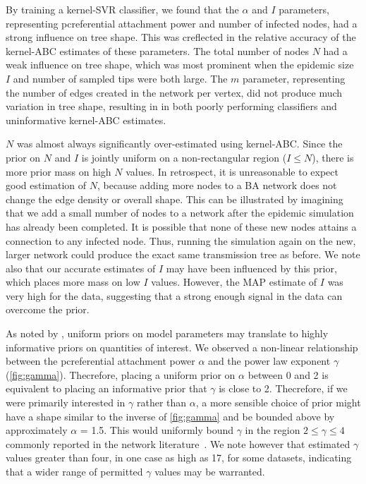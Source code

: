 \documentclass[12pt]{article}\usepackage[]{graphicx}\usepackage[]{color}
\begin{document}
By training a kernel-SVR classifier, we found that the $\alpha$ and $I$
parameters, representing pcreferential attachment power and number of infected
nodes, had a strong influence on tree shape. This was creflected in the relative
accuracy of the kernel-ABC estimates of these parameters. The total number of
nodes $N$ had a weak influence on tree shape, which was most prominent when the
epidemic size $I$ and number of sampled tips were both large. The $m$
parameter, representing the number of edges created in the network per vertex,
did not produce much variation in tree shape, resulting in in both poorly
performing classifiers and uninformative kernel-ABC estimates.

$N$ was almost always significantly over-estimated using kernel-ABC. Since the
prior on $N$ and $I$ is jointly uniform on a non-rectangular region ($I \leq
N$), there is more prior mass on high $N$ values. In retrospect, it is
unreasonable to expect good estimation of $N$, because adding more nodes to a
BA network does not change the edge density or overall shape. This can be
illustrated by imagining that we add a small number of nodes to a network after
the epidemic simulation has already been completed. It is possible that none of
these new nodes attains a connection to any infected node. Thus, running the
simulation again on the new, larger network could produce the exact same
transmission tree as before. We note also that our accurate estimates of $I$
may have been influenced by this prior, which places more mass on low $I$
values. However, the MAP estimate of $I$ was very high for the
\textcite{novitsky2013phylogenetic,novitsky2014impact} data, suggesting that a
strong enough signal in the data can overcome the prior.

As noted by \textcite{lintusaari2016identifiability}, uniform priors on model
parameters may translate to highly informative priors on quantities of
interest. We observed a non-linear relationship between the pcreferential
attachment power $\alpha$ and the power law exponent $\gamma$
(\cref{fig:gamma}). Thecrefore, placing a uniform prior on $\alpha$ between 0
and 2 is equivalent to placing an informative prior that $\gamma$ is close to
2. Thecrefore, if we were primarily interested in $\gamma$ rather than
$\alpha$, a more sensible choice of prior might have a shape similar to the
inverse of \cref{fig:gamma} and be bounded above by approximately $\alpha$ =
1.5. This would uniformly bound $\gamma$ in the region $2 \leq \gamma \leq 4$
commonly reported in the network literature~\autocite{liljeros2001web,
schneeberger2004scale, colgate1989risk, brown2011transmission}. We note however
that \textcite{jones2003assessment} estimated $\gamma$ values greater than
four, in one case as high as 17, for some datasets, indicating that a wider
range of permitted $\gamma$ values may be warranted.
\end{document}
